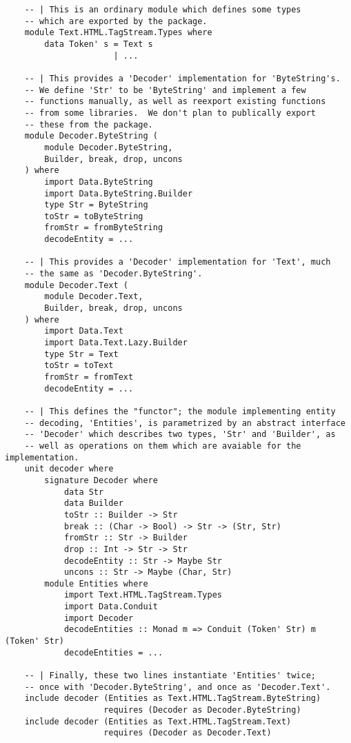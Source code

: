 \documentclass{article}
\begin{document}
\begin{verbatim}
    -- | This is an ordinary module which defines some types
    -- which are exported by the package.
    module Text.HTML.TagStream.Types where
        data Token' s = Text s
                      | ...

    -- | This provides a 'Decoder' implementation for 'ByteString's.
    -- We define 'Str' to be 'ByteString' and implement a few
    -- functions manually, as well as reexport existing functions
    -- from some libraries.  We don't plan to publically export
    -- these from the package.
    module Decoder.ByteString (
        module Decoder.ByteString,
        Builder, break, drop, uncons
    ) where
        import Data.ByteString
        import Data.ByteString.Builder
        type Str = ByteString
        toStr = toByteString
        fromStr = fromByteString
        decodeEntity = ...

    -- | This provides a 'Decoder' implementation for 'Text', much
    -- the same as 'Decoder.ByteString'.
    module Decoder.Text (
        module Decoder.Text,
        Builder, break, drop, uncons
    ) where
        import Data.Text
        import Data.Text.Lazy.Builder
        type Str = Text
        toStr = toText
        fromStr = fromText
        decodeEntity = ...

    -- | This defines the "functor"; the module implementing entity
    -- decoding, 'Entities', is parametrized by an abstract interface
    -- 'Decoder' which describes two types, 'Str' and 'Builder', as
    -- well as operations on them which are avaiable for the implementation.
    unit decoder where
        signature Decoder where
            data Str
            data Builder
            toStr :: Builder -> Str
            break :: (Char -> Bool) -> Str -> (Str, Str)
            fromStr :: Str -> Builder
            drop :: Int -> Str -> Str
            decodeEntity :: Str -> Maybe Str
            uncons :: Str -> Maybe (Char, Str)
        module Entities where
            import Text.HTML.TagStream.Types
            import Data.Conduit
            import Decoder
            decodeEntities :: Monad m => Conduit (Token' Str) m (Token' Str)
            decodeEntities = ...

    -- | Finally, these two lines instantiate 'Entities' twice;
    -- once with 'Decoder.ByteString', and once as 'Decoder.Text'.
    include decoder (Entities as Text.HTML.TagStream.ByteString)
                    requires (Decoder as Decoder.ByteString)
    include decoder (Entities as Text.HTML.TagStream.Text)
                    requires (Decoder as Decoder.Text)
\end{verbatim}
\end{document}
